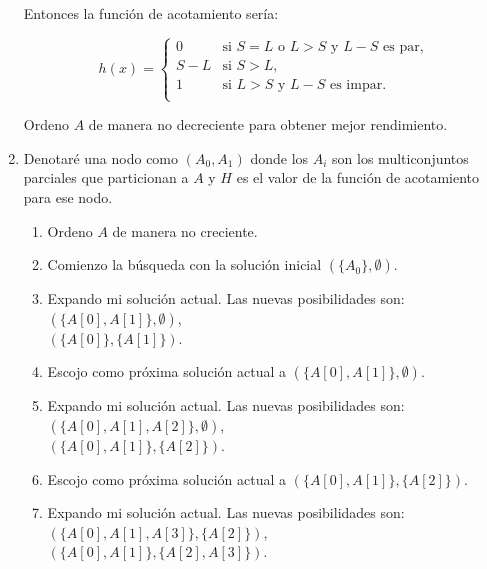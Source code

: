 \documentclass{article}
\begin{document}
\begin{enumerate}
Entonces la función de acotamiento sería:

\begin{equation*}
h(x) = 
\begin{cases}
0 & \text{si $S=L$ o $L>S$ y $L-S$ es par,} \\
S-L &\text{si $S>L$,} \\
1 &\text{si $L>S$ y $L-S$ es impar.} \\
\end{cases}
\end{equation*}

Ordeno $A$ de manera no decreciente para obtener mejor rendimiento.

 \item

Denotaré una nodo como $(A_0,A_1)$ donde los $A_i$ son los multiconjuntos parciales que particionan a
$A$ y $H$ es  el valor de la función de acotamiento para ese nodo.

\renewcommand{\labelenumii}{\arabic{enumii}.}

\begin{enumerate}

\item Ordeno $A$ de manera no creciente.

\item Comienzo la búsqueda con la solución inicial $(\{A_0\},\emptyset)$.

\item Expando mi solución actual. Las nuevas posibilidades son: \\
$(\{A[0],A[1]\},\emptyset)$,\\
$(\{A[0]\},\{A[1]\})$.

\item Escojo como próxima solución actual a $(\{A[0],A[1]\},\emptyset)$.

\item Expando mi solución actual. Las nuevas posibilidades son: \\
$(\{A[0],A[1],A[2]\},\emptyset)$,\\
$(\{A[0],A[1]\},\{A[2]\})$.

\item Escojo como próxima solución actual a $(\{A[0],A[1]\},\{A[2]\})$.

\item Expando mi solución actual. Las nuevas posibilidades son: \\
$(\{A[0],A[1],A[3]\},\{A[2]\})$,\\
$(\{A[0],A[1]\},\{A[2],A[3]\})$.


\end{enumerate}
\end{enumerate}
\end{document}
